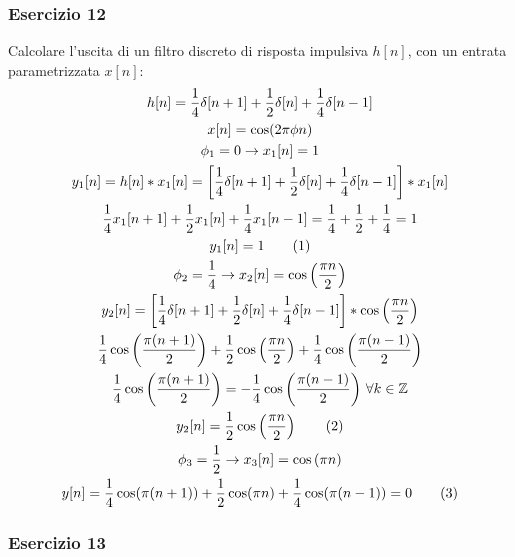 \documentclass{article}
\newcommand{\tageq}{\tag{\stepcounter{equation}\theequation}}
\begin{document}
\subsubsection*{Esercizio 12}

Calcolare l'uscita di un filtro discreto di risposta impulsiva $h[n]$, con un entrata parametrizzata $x[n]$:
\begin{gather*}
    h[n]=\displaystyle\frac{1}{4}\delta[n+1]+\frac{1}{2}\delta[n]+\frac{1}{4}\delta[n-1]\\
    x[n]=\cos(2\pi\phi n)\\
    \phi_1=0\to x_1[n]=1\\
    y_1[n]=h[n]*x_1[n]=\displaystyle\left[\frac{1}{4}\delta[n+1]+\frac{1}{2}\delta[n]+\frac{1}{4}\delta[n-1]\right]*x_1[n]\\
    \displaystyle\frac{1}{4}x_1[n+1]+\frac{1}{2}x_1[n]+\frac{1}{4}x_1[n-1]=\frac{1}{4}+\frac{1}{2}+\frac{1}{4}=1\\
    y_1[n]=1\tageq\\
    \phi_2=\displaystyle\frac{1}{4}\to x_2[n]=\cos\left(\displaystyle\frac{\pi n}{2}\right)\\
    y_2[n]=\left[\displaystyle\frac{1}{4}\delta[n+1]+\frac{1}{2}\delta[n]+\frac{1}{4}\delta[n-1]\right]*\cos\left(\frac{\pi n}{2}\right)\\
    \displaystyle\frac{1}{4}\cos\left(\frac{\pi (n+1)}{2}\right)+\frac{1}{2}\cos\left(\frac{\pi n}{2}\right)+\frac{1}{4}\cos\left(\frac{\pi (n-1)}{2}\right)\\
    \displaystyle\frac{1}{4}\cos\left(\frac{\pi (n+1)}{2}\right)=-\frac{1}{4}\cos\left(\frac{\pi (n-1)}{2}\right)\,\forall k\in\mathbb{Z}\\
    y_2[n]=\displaystyle\frac{1}{2}\cos\left(\frac{\pi n}{2}\right)\tageq\\
    \phi_3=\displaystyle\frac{1}{2}\to x_3[n]=\cos\left(\displaystyle{\pi n}\right)\\
    y[n]=\displaystyle\frac{1}{4}\cos(\pi (n+1))+\frac{1}{2}\cos(\pi n)+\frac{1}{4}\cos(\pi(n-1))=0\tageq
\end{gather*}

\subsubsection*{Esercizio 13}
\end{document}

